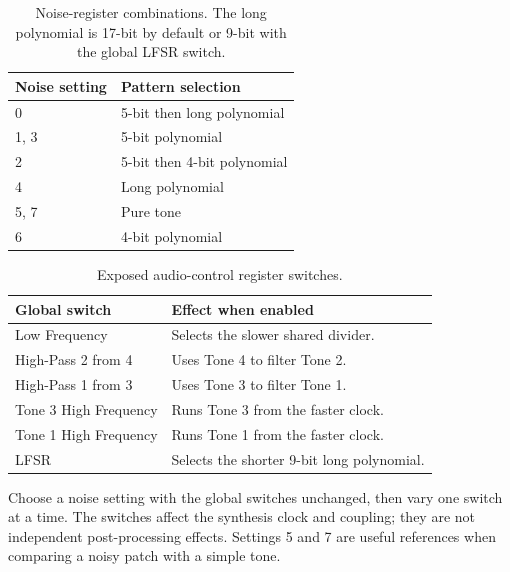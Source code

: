 \begin{table}[ht]\centering
\begin{tabularx}{\textwidth}{@{}lX@{}}
\toprule Noise setting & Pattern selection \\\midrule
0 & 5-bit then long polynomial \\
1, 3 & 5-bit polynomial \\
2 & 5-bit then 4-bit polynomial \\
4 & Long polynomial \\
5, 7 & Pure tone \\
6 & 4-bit polynomial \\\bottomrule
\end{tabularx}
\caption{Noise-register combinations. The long polynomial is 17-bit by
default or 9-bit with the global LFSR switch.}
\label{tab:shift-register}
\end{table}

\begin{table}[ht]\centering
\begin{tabularx}{\textwidth}{@{}lX@{}}
\toprule Global switch & Effect when enabled \\\midrule
Low Frequency & Selects the slower shared divider. \\
High-Pass 2 from 4 & Uses Tone 4 to filter Tone 2. \\
High-Pass 1 from 3 & Uses Tone 3 to filter Tone 1. \\
Tone 3 High Frequency & Runs Tone 3 from the faster clock. \\
Tone 1 High Frequency & Runs Tone 1 from the faster clock. \\
LFSR & Selects the shorter 9-bit long polynomial. \\\bottomrule
\end{tabularx}
\caption{Exposed audio-control register switches.}
\label{tab:audio-control}
\end{table}

Choose a noise setting with the global switches unchanged, then vary one
switch at a time. The switches affect the synthesis clock and coupling;
they are not independent post-processing effects. Settings 5 and 7 are
useful references when comparing a noisy patch with a simple tone.
